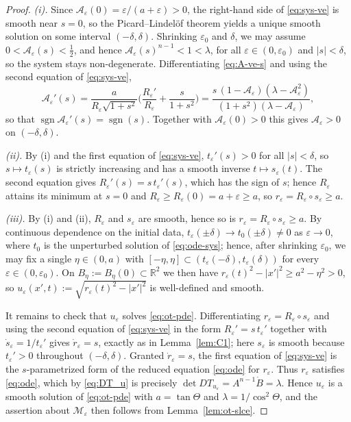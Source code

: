 \documentclass[12pt,letterpaper]{amsart}
\theoremstyle{definition}
\theoremstyle{plain}
\numberwithin{equation}{section}
\newcommand{\R}{\mathbb{R}}
\newcommand{\ve}{\varepsilon}
\begin{document}
\begin{proof}
    {\it (i).} Since $\mathcal{A}_\ve(0)=\varepsilon/(a+\varepsilon)>0$, the right-hand side of
    \eqref{eq:sys-ve} is smooth near $s=0$, so the Picard--Lindel\"of theorem yields a unique
    smooth solution on some interval $(-\delta,\delta)$. Shrinking $\varepsilon_0$ and $\delta$,
    we may assume $0<\mathcal{A}_\ve(s)<\tfrac12$, and hence $\mathcal{A}_\ve(s)^{n-1}<1<\lambda$,
    for all $\varepsilon\in(0,\varepsilon_0)$ and $|s|<\delta$, so the system stays
    non-degenerate. Differentiating \eqref{eq:A-ve-s} and using the second equation of
    \eqref{eq:sys-ve},
    \[
        \mathcal{A}_\ve'(s)
        =\frac{a}{R_\ve\sqrt{1+s^2}}\Big(\frac{R_\ve'}{R_\ve}+\frac{s}{1+s^2}\Big)
        =\frac{s\,(1-\mathcal{A}_\ve)(\lambda-\mathcal{A}_\ve^2)}{(1+s^2)(\lambda-\mathcal{A}_\ve)},
    \]
    so that $\operatorname{sgn}\mathcal{A}_\ve'(s)=\operatorname{sgn}(s)$. Together with
    $\mathcal{A}_\ve(0)>0$ this gives $\mathcal{A}_\ve>0$ on $(-\delta,\delta)$.

    {\it (ii).} By (i) and the first equation of \eqref{eq:sys-ve}, $t_\ve'(s)>0$ for all
    $|s|<\delta$, so $s\mapsto t_\ve(s)$ is strictly increasing and has a smooth inverse
    $t\mapsto s_\ve(t)$. The second equation gives $R_\ve'(s)=s\,t_\ve'(s)$, which has the sign
    of $s$; hence $R_\ve$ attains its minimum at $s=0$ and $R_\ve\geq R_\ve(0)=a+\varepsilon\geq a$,
    so $r_\ve=R_\ve\circ s_\ve\geq a$.

    {\it (iii).} By (i) and (ii), $R_\ve$ and $s_\ve$ are smooth, hence so is
    $r_\ve=R_\ve\circ s_\ve\geq a$. By continuous dependence on the initial data,
    $t_\ve(\pm\delta)\to t_0(\pm\delta)\neq0$ as $\varepsilon\to0$, where $t_0$ is the
    unperturbed solution of \eqref{eq:ode-sys}; hence, after shrinking $\varepsilon_0$, we may fix
    a single $\eta\in(0,a)$ with $[-\eta,\eta]\subset(t_\ve(-\delta),t_\ve(\delta))$ for every
    $\varepsilon\in(0,\varepsilon_0)$. On $B_\eta:=B_\eta(0)\subset\R^2$ we then have
    $r_\ve(t)^2-|x'|^2\geq a^2-\eta^2>0$, so $u_\ve(x',t):=\sqrt{r_\ve(t)^2-|x'|^2}$ is
    well-defined and smooth.

    It remains to check that $u_\ve$ solves \eqref{eq:ot-pde}. Differentiating
    $r_\ve=R_\ve\circ s_\ve$ and using the second equation of \eqref{eq:sys-ve} in the form
    $R_\ve'=s\,t_\ve'$ together with $\dot s_\ve=1/t_\ve'$ gives $\dot r_\ve=s$, exactly as in
    Lemma~\ref{lem:C1}; here $s_\ve$ is smooth because $t_\ve'>0$ throughout $(-\delta,\delta)$.
    Granted $\dot r_\ve=s$, the first equation of \eqref{eq:sys-ve} is the $s$-parametrized form
    of the reduced equation \eqref{eq:ode} for $r_\ve$.
    Thus $r_\ve$ satisfies \eqref{eq:ode},
    which by \eqref{eq:DT_u} is precisely $\det DT_{u_\ve}=A^{n-1}\dot B=\lambda$. Hence $u_\ve$ is
    a smooth solution of \eqref{eq:ot-pde} with $a=\tan\Theta$ and $\lambda=1/\cos^2\Theta$, and
    the assertion about $\mathcal{M}_\ve$ then follows from Lemma~\ref{lem:ot-slce}.
\end{proof}
\end{document}
